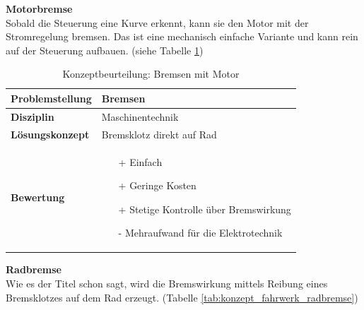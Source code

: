 \documentclass[../../main.tex]{subfiles}
\begin{document}
    \textbf{Motorbremse}\\
    Sobald die Steuerung eine Kurve erkennt, kann sie den Motor mit der Stromregelung bremsen. Das ist eine mechanisch einfache Variante und kann rein auf der Steuerung aufbauen. (siehe Tabelle \ref{tab:konzept_fahrwerk_motorbremse})

    \begin{flushleft}
        \begin{table}[h]
        \begin{tabular}{ | l | p{11cm} |}
        \hline
        \textbf{Problemstellung} & Bremsen \\ \hline
        \textbf{Disziplin} & Maschinentechnik \\ \hline
        \textbf{Lösungskonzept} & Bremsklotz direkt auf Rad \\ \hline
        \textbf{Bewertung} &  \begin{itemize}
                                \item[+] Einfach
                                \item[+] Geringe Kosten
                                \item[+] Stetige Kontrolle über Bremswirkung 
                                \item[-] Mehraufwand für die Elektrotechnik 
                              \end{itemize} \\ \hline
        \end{tabular}
        \caption{Konzeptbeurteilung: Bremsen mit Motor}
        \label{tab:konzept_fahrwerk_motorbremse}
    \end{table}
    \end{flushleft}

    \textbf{Radbremse}\\
    Wie es der Titel schon sagt, wird die Bremswirkung mittels Reibung eines Bremsklotzes auf dem Rad erzeugt. (Tabelle \ref{tab:konzept_fahrwerk_radbremse})
\end{document}
